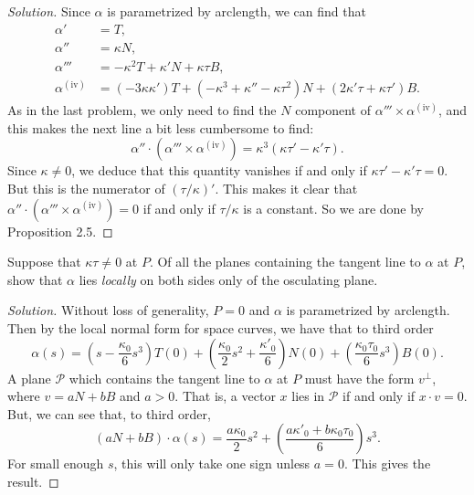 \documentclass[Shifrin_Solutions_Spring_2018]{subfiles}
\begin{document}
\begin{proof}[Solution]
Since $\alpha$ is parametrized by arclength, we can find that
\begin{align*}
\alpha' & = T ,\\
\alpha'' & = \kappa N ,\\
\alpha''' & = -\kappa^2 T +  \kappa' N + \kappa\tau B , \\
\alpha^{\mathrm{(iv)}} & = (-3\kappa \kappa') T + (-\kappa^3 + \kappa''  - \kappa \tau^2 ) N + (2\kappa'\tau + \kappa \tau') B.
\end{align*}
As in the last problem, we only need to find the $N$ component of $\alpha'''\times \alpha^{\mathrm{(iv)}}$, and this makes the next line a bit less cumbersome to find:
\[
\alpha''\cdot (\alpha''' \times \alpha^{\mathrm{(iv)}} ) = \kappa^3 ( \kappa \tau' - \kappa' \tau ) .
\]
Since $\kappa \neq 0$, we deduce that this quantity vanishes if and only if $\kappa \tau' - \kappa' \tau = 0$. But this is the numerator of
$(\tau/\kappa)'$. This makes it clear that $\alpha''\cdot(\alpha'''\times\alpha^{(\mathrm{iv})}) = 0$ if and only if $\tau/\kappa$ is a constant. So we are done by Proposition 2.5.
\end{proof}

\vspace{.5cm}


\begin{exercise}
Suppose that $\kappa\tau \neq 0$ at $P$. Of all the planes containing the tangent line to $\alpha$ at $P$, show that $\alpha$ lies \emph{locally} on both sides only of the osculating plane.
\end{exercise}

\begin{proof}[Solution]
Without loss of generality, $P= 0$ and $\alpha$ is parametrized by arclength. Then by the local normal form for space curves, we have that to third order
\[
\alpha(s) = \left(s - \dfrac{\kappa_0}{6} s^3 \right) T(0) + \left( \dfrac{\kappa_0}{2}s^2 + \dfrac{\kappa'_0}{6} \right) N(0) + \left( \dfrac{\kappa_0\tau_0}{6} s^3 \right) B(0) .
\]
A plane $\mathcal{P}$ which contains the tangent line to $\alpha$ at $P$ must have the form $v^{\perp}$, where $v = a N + b B$ and $a>0$. That is, a vector $x$ lies in $\mathcal{P}$ if and only if $
x \cdot v = 0$. But, we can see that, to third order,
\[
(a N + b B ) \cdot \alpha(s) = \dfrac{a\kappa_0}{2} s^2 + \left( \dfrac{a\kappa'_0 + b\kappa_0 \tau_0}{6} \right) s^3 .
\]
For small enough $s$, this will only take one sign unless $a=0$. This gives the result.
\end{proof}
\end{document}

